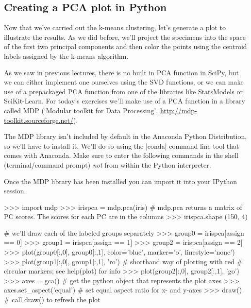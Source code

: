 \subsection{Creating a PCA plot in Python}

Now that we've carried out the k-means clustering, let's generate a plot to illustrate the results.  As we did before, we'll project the specimens into the space of the first two principal components and then color the points using the centroid labels assigned by the k-means algorithm.  

As we saw in previous lectures, there is no built in PCA function in SciPy, but we can either implement one ourselves using the SVD functions, or we can make use of a prepackaged PCA function from one of the libraries like StatsModels or SciKit-Learn.  For today's exercises we'll make use of a PCA function in a library called MDP (`Modular toolkit for Data Processing', \url{http://mdp-toolkit.sourceforge.net/}).  

The MDP library isn't included by default in the Anaconda Python Distribution, so we'll have to install it. We'll do so using the |conda| command line tool that comes with Anaconda.  Make sure to enter the following commands in the shell (terminal/command prompt) \emph{not} from within the Python interpreter.


Once the MDP library has been installed you can import it into your IPython session.

%
\begin{python}
>>> import mdp
>>> irispca = mdp.pca(iris)
# mdp.pca returns a matrix of PC scores.  The scores for each PC are in the columns
>>> irispca.shape
(150, 4)

# we'll draw each of the labeled groups separately
>>> group0 = irispca[assign == 0]
>>> group1 = irispca[assign == 1]
>>> group2 = irispca[assign == 2]
>>> plot(group0[:,0], group0[:,1], color='blue', marker='o', linestyle='none')
>>> plot(group1[:,0], group1[:,1], 'ro')  # shorthand way of plotting with red
                                          # circular markers; see help(plot) for info
>>> plot(group2[:,0], group2[:,1], 'go')
>>> axes = gca()  # get the python object that represents the plot axes
>>> axes.set_aspect('equal') # set equal aspect ratio for x- and y-axes
>>> draw()  # call draw() to refresh the plot
\end{python}

